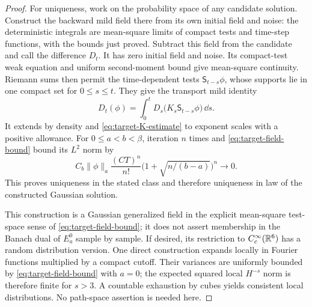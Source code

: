 \begin{proof}
For uniqueness, work on the probability space of any candidate solution.
Construct the backward mild field there from its own initial field and
noise: the deterministic integrals are mean-square limits of compact
tests and time-step functions, with the bounds just proved.
Subtract this field from the candidate and call the difference $D_t$.
It has zero initial field and noise.  Its compact-test weak equation and
uniform second-moment bound give mean-square continuity.  Riemann sums
then permit the time-dependent tests $\mathsf S_{t-s}\phi$, whose
supports lie in one compact set for $0\le s\le t$.  They give
the transport mild identity
\[
 D_t(\phi)=\int_0^t
       D_s\bigl(K_s\mathsf S_{t-s}\phi\bigr)\,\dd s.
\]
It extends by density and \eqref{eq:target-K-estimate} to exponent
scales with a positive allowance.
For $0\le a<b<\beta$, iteration $n$ times and
\eqref{eq:target-field-bound} bound its $L^2$ norm by
\[
 C_b\|\phi\|_a\frac{(CT)^n}{n!}
             \bigl(1+\sqrt{n/(b-a)}\bigr)^n\longrightarrow0.
\]
This proves uniqueness in the stated class and therefore uniqueness
in law of the constructed Gaussian solution.

This construction is a Gaussian generalized field in the explicit
mean-square test-space sense of \eqref{eq:target-field-bound}; it does
not assert membership in the Banach dual of $E_a^0$ sample by sample.
If desired, its restriction to $C_c^\infty(\mathbb R^6)$ has a random
distribution version.  One direct construction expands locally in
Fourier functions multiplied by a compact cutoff.  Their variances
are uniformly bounded by \eqref{eq:target-field-bound} with $a=0$;
the expected squared local $H^{-s}$ norm is therefore finite for
$s>3$.  A countable exhaustion by cubes yields consistent local
distributions.  No path-space assertion is needed here.
\end{proof}
